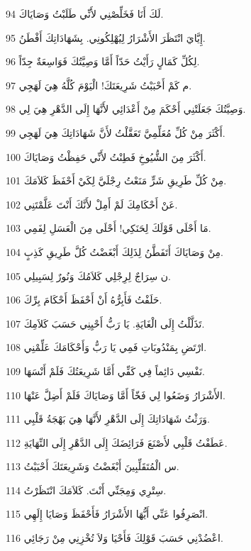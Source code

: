 \par 94 لَكَ أَنَا فَخَلِّصْنِي لأَنِّي طَلَبْتُ وَصَايَاكَ.
\par 95 إِيَّايَ انْتَظَرَ الأَشْرَارُ لِيُهْلِكُونِي. بِشَهَادَاتِكَ أَفْطَنُ.
\par 96 لِكُلِّ كَمَالٍ رَأَيْتُ حَدّاً أَمَّا وَصِيَّتُكَ فَوَاسِعَةٌ جِدّاً.
\par 97 م كَمْ أَحْبَبْتُ شَرِيعَتَكَ! الْيَوْمَ كُلَّهُ هِيَ لَهَجِي.
\par 98 وَصِيَّتُكَ جَعَلَتْنِي أَحْكَمَ مِنْ أَعْدَائِي لأَنَّهَا إِلَى الدَّهْرِ هِيَ لِي.
\par 99 أَكْثَرَ مِنْ كُلِّ مُعَلِّمِيَّ تَعَقَّلْتُ لأَنَّ شَهَادَاتِكَ هِيَ لَهَجِي.
\par 100 أَكْثَرَ مِنَ الشُّيُوخِ فَطِنْتُ لأَنِّي حَفِظْتُ وَصَايَاكَ.
\par 101 مِنْ كُلِّ طَرِيقِ شَرٍّ مَنَعْتُ رِجْلَيَّ لِكَيْ أَحْفَظَ كَلاَمَكَ.
\par 102 عَنْ أَحْكَامِكَ لَمْ أَمِلْ لأَنَّكَ أَنْتَ عَلَّمْتَنِي.
\par 103 مَا أَحْلَى قَوْلَكَ لِحَنَكِي! أَحْلَى مِنَ الْعَسَلِ لِفَمِي.
\par 104 مِنْ وَصَايَاكَ أَتَفَطَّنُ لِذَلِكَ أَبْغَضْتُ كُلَّ طَرِيقِ كَذِبٍ.
\par 105 ن سِرَاجٌ لِرِجْلِي كَلاَمُكَ وَنُورٌ لِسَبِيلِي.
\par 106 حَلَفْتُ فَأَبِرُّهُ أَنْ أَحْفَظَ أَحْكَامَ بِرِّكَ.
\par 107 تَذَلَّلْتُ إِلَى الْغَايَةِ. يَا رَبُّ أَحْيِنِي حَسَبَ كَلاَمِكَ.
\par 108 ارْتَضِ بِمَنْدُوبَاتِ فَمِي يَا رَبُّ وَأَحْكَامَكَ عَلِّمْنِي.
\par 109 نَفْسِي دَائِماً فِي كَفِّي أَمَّا شَرِيعَتُكَ فَلَمْ أَنْسَهَا.
\par 110 الأَشْرَارُ وَضَعُوا لِي فَخّاً أَمَّا وَصَايَاكَ فَلَمْ أَضِلَّ عَنْهَا.
\par 111 وَرَثْتُ شَهَادَاتِكَ إِلَى الدَّهْرِ لأَنَّهَا هِيَ بَهْجَةُ قَلْبِي.
\par 112 عَطَفْتُ قَلْبِي لأَصْنَعَ فَرَائِضَكَ إِلَى الدَّهْرِ إِلَى النِّهَايَةِ.
\par 113 س الْمُتَقَلِّبِينَ أَبْغَضْتُ وَشَرِيعَتَكَ أَحْبَبْتُ.
\par 114 سِتْرِي وَمِجَنِّي أَنْتَ. كَلاَمَكَ انْتَظَرْتُ.
\par 115 انْصَرِفُوا عَنِّي أَيُّهَا الأَشْرَارُ فَأَحْفَظَ وَصَايَا إِلَهِي.
\par 116 اعْضُدْنِي حَسَبَ قَوْلِكَ فَأَحْيَا وَلاَ تُخْزِنِي مِنْ رَجَائِي.
